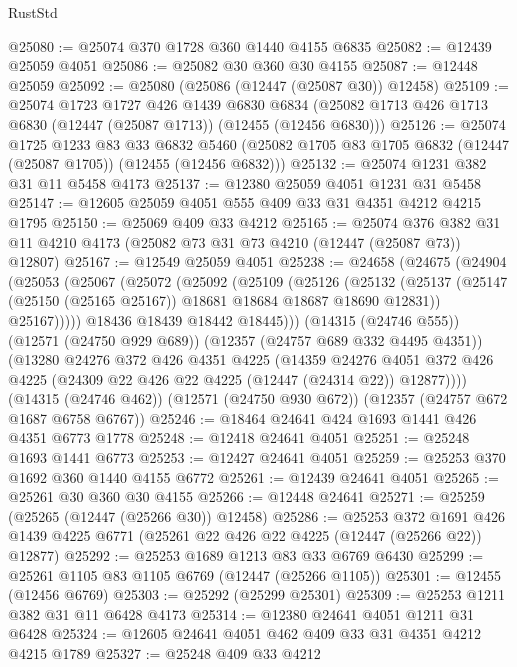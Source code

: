 \begin{lexlean}{RustStd}
\begin{coremodule}
@25080 := @25074 @370 @1728 @360 @1440 @4155 @6835
@25082 := @12439 @25059 @4051
@25086 := @25082 @30 @360 @30 @4155
@25087 := @12448 @25059
@25092 := @25080 (@25086 (@12447 (@25087 @30)) @12458)
@25109 := @25074
    @1723
    @1727
    @426
    @1439
    @6830
    @6834
    (@25082 @1713 @426 @1713 @6830 (@12447 (@25087 @1713)) (@12455 (@12456 @6830)))
@25126 := @25074
    @1725
    @1233
    @83
    @33
    @6832
    @5460
    (@25082 @1705 @83 @1705 @6832 (@12447 (@25087 @1705)) (@12455 (@12456 @6832)))
@25132 := @25074 @1231 @382 @31 @11 @5458 @4173
@25137 := @12380 @25059 @4051 @1231 @31 @5458
@25147 := @12605 @25059 @4051 @555 @409 @33 @31 @4351 @4212 @4215 @1795
@25150 := @25069 @409 @33 @4212
@25165 := @25074
    @376
    @382
    @31
    @11
    @4210
    @4173
    (@25082 @73 @31 @73 @4210 (@12447 (@25087 @73)) @12807)
@25167 := @12549 @25059 @4051
@25238 := @24658
    (@24675
      (@24904
        (@25053
          (@25067
            (@25072
              (@25092
                (@25109
                  (@25126
                    (@25132
                      (@25137 (@25147 (@25150 (@25165 @25167)) @18681 @18684 @18687 @18690 @12831))
                      @25167)))))
            @18436
            @18439
            @18442
            @18445)))
      (@14315 (@24746 @555))
      (@12571 (@24750 @929 @689))
      (@12357 (@24757 @689 @332 @4495 @4351))
      (@13280
        @24276
        @372
        @426
        @4351
        @4225
        (@14359
          @24276
          @4051
          @372
          @426
          @4225
          (@24309 @22 @426 @22 @4225 (@12447 (@24314 @22)) @12877))))
    (@14315 (@24746 @462))
    (@12571 (@24750 @930 @672))
    (@12357 (@24757 @672 @1687 @6758 @6767))
@25246 := @18464 @24641 @424 @1693 @1441 @426 @4351 @6773 @1778
@25248 := @12418 @24641 @4051
@25251 := @25248 @1693 @1441 @6773
@25253 := @12427 @24641 @4051
@25259 := @25253 @370 @1692 @360 @1440 @4155 @6772
@25261 := @12439 @24641 @4051
@25265 := @25261 @30 @360 @30 @4155
@25266 := @12448 @24641
@25271 := @25259 (@25265 (@12447 (@25266 @30)) @12458)
@25286 := @25253
    @372
    @1691
    @426
    @1439
    @4225
    @6771
    (@25261 @22 @426 @22 @4225 (@12447 (@25266 @22)) @12877)
@25292 := @25253 @1689 @1213 @83 @33 @6769 @6430
@25299 := @25261 @1105 @83 @1105 @6769 (@12447 (@25266 @1105))
@25301 := @12455 (@12456 @6769)
@25303 := @25292 (@25299 @25301)
@25309 := @25253 @1211 @382 @31 @11 @6428 @4173
@25314 := @12380 @24641 @4051 @1211 @31 @6428
@25324 := @12605 @24641 @4051 @462 @409 @33 @31 @4351 @4212 @4215 @1789
@25327 := @25248 @409 @33 @4212

\end{coremodule}
\end{lexlean}
